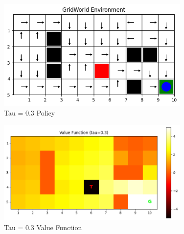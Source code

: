 \documentclass[12pt]{article}
\begin{document}
\begin{figure}[H]
  \centering
  \includegraphics[width=0.85\textwidth]{images/part2_q3_tau_0.3_policy.png}
  \caption{Tau = 0.3 Policy}
\end{figure}
\begin{figure}[H]
  \centering
  \includegraphics[width=0.85\textwidth]{images/part2_q3_tau_0.3_value.png}
  \caption{Tau = 0.3 Value Function}
\end{figure}
\end{document}
